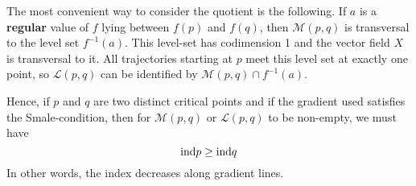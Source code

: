 \begin{remark}
    The most convenient way to consider the quotient is the following. If $a$ is a 
    \textbf{regular} value of $f$ lying between $f(p)$ and $f(q)$, then $\mathcal{M}(p, q)$ 
    is transversal to the level set $f^{-1}(a)$. This level-set has codimension 1 and the 
    vector field $X$ is transversal to it. All trajectories starting at $p$ meet this level
    set at exactly one point, so $\mathcal{L}(p, q)$ can be identified by 
    $\mathcal{M}(p, q) \cap f^{-1}(a)$.

    Hence, if $p$ and $q$ are two distinct critical points and if the gradient used 
    satisfies the Smale-condition, then for $\mathcal{M}(p, q)$ or $\mathcal{L}(p, q)$
    to be non-empty, we must have 
    \[ { \operatorname{ind} } p \geq { \operatorname{ind} } q \]
    In other words, the index decreases along gradient lines.
\end{remark}
